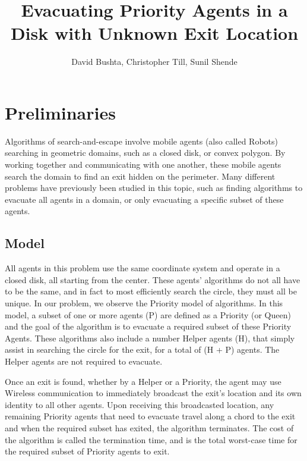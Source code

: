 \documentclass[11pt]{article}
\title{Evacuating Priority Agents in a Disk with Unknown Exit Location}
\author{David Bushta, Christopher Till, Sunil Shende}
\begin{document}
\maketitle
\section{Preliminaries}

\begin{flushleft}
Algorithms of search-and-escape involve mobile agents (also called Robots)
searching in geometric domains, such as a closed disk, or convex polygon. By
working together and communicating with one another, these mobile agents search
the domain to find an exit hidden on the perimeter. Many different problems have
previously been studied in this topic, such as finding algorithms to evacuate all
agents in a domain, or only evacuating a specific subset of these agents.
\end{flushleft}

\subsection{Model}

\begin{flushleft}

All agents in this problem use the same coordinate system and operate in a closed
disk, all starting from the center. These agents' algorithms do not all have to be the same,
and in fact to most efficiently search the circle, they must all be unique.
In our problem, we observe the Priority model of algorithms. In this model, a
subset of one or more agents (P) are defined as a Priority (or Queen) and the goal
of the algorithm is to evacuate a required subset of these Priority Agents. These
algorithms also include a number Helper agents (H), that simply assist in searching the circle
for the exit, for a total of (H + P) agents. The Helper agents are not required to evacuate.


\vspace*{5mm} \hspace{\parindent} Once an exit is found, whether by a Helper or a Priority, the agent may use
Wireless communication to immediately broadcast the exit's location and its own identity to all other agents.
Upon receiving this broadcasted location, any remaining Priority agents that
need to evacuate travel along a chord to the exit and when the required subset has exited, the algorithm terminates.
The cost of the algorithm is called the termination time, and is the total worst-case
time for the required subset of Priority agents to exit.
\end{flushleft}
\end{document}
